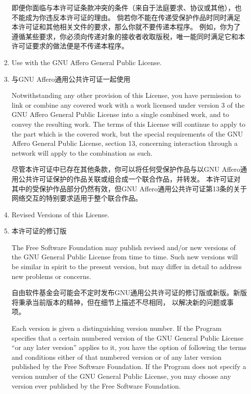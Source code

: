 \documentclass[11pt]{article}
\begin{document}
\begin{enumerate}
        即便你面临与本许可证条款冲突的条件（来自于法庭要求、协议或其他），也不能成为你违反本许可证的理由。
        倘若你不能在传递受保护作品时同时满足本许可证和其他相关文件的要求，那么你就不要传递本程序。
        例如，你为了遵循某些要求，你必须向传递对象的接收者收取版税，唯一能同时满足它和本许可证要求的做法便是不传递本程序。

  \item Use with the GNU Affero General Public License.
  \item 与GNU Affero通用公共许可证一起使用

        Notwithstanding any other provision of this License, you have
        permission to link or combine any covered work with a work licensed
        under version 3 of the GNU Affero General Public License into a single
        combined work, and to convey the resulting work.  The terms of this
        License will continue to apply to the part which is the covered work,
        but the special requirements of the GNU Affero General Public License,
        section 13, concerning interaction through a network will apply to the
        combination as such.

        尽管本许可证中已存在其他条款，你可以将任何受保护作品与以GNU Affero通用公共许可证保护的作品关联或组合成一个联合作品，并转发。
        本许可证对其中的受保护作品部分仍然有效，但GNU Affero通用公共许可证第13条的关于网络交互的特别要求适用于整个联合作品。

  \item Revised Versions of this License.
  \item 本许可证的修订版

        The Free Software Foundation may publish revised and/or new versions of
        the GNU General Public License from time to time.  Such new versions will
        be similar in spirit to the present version, but may differ in detail to
        address new problems or concerns.

        自由软件基金会可能会不定时发布GNU通用公共许可证的修订版或新版。新版将秉承当前版本的精神，但在细节上描述不尽相同，
        以解决新的问题或事项。

        Each version is given a distinguishing version number.  If the
        Program specifies that a certain numbered version of the GNU General
        Public License ``or any later version'' applies to it, you have the
        option of following the terms and conditions either of that numbered
        version or of any later version published by the Free Software
        Foundation.  If the Program does not specify a version number of the
        GNU General Public License, you may choose any version ever published
        by the Free Software Foundation.


\end{enumerate}
\end{document}
